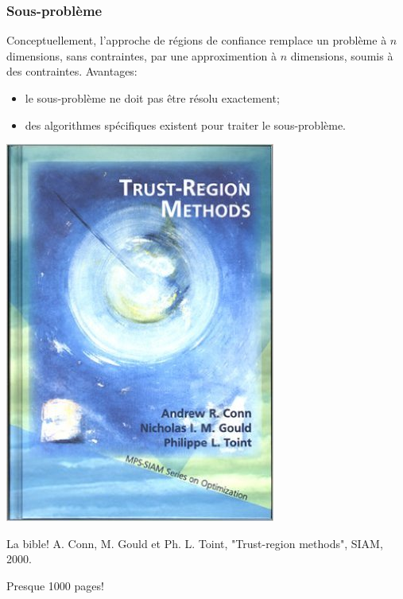 \documentclass[t,usepdftitle=false]{beamer}
\begin{document}
\begin{frame}
\frametitle{Sous-problème}

Conceptuellement, l'approche de régions de confiance remplace un problème à $n$ dimensions, sans contraintes, par une approximention à $n$ dimensions, soumis à des contraintes.
Avantages:
\begin{itemize}
\item
le sous-problème ne doit pas être résolu exactement;
\item
des algorithmes spécifiques existent pour traiter le sous-problème.
\end{itemize}

\begin{minipage}{0.3\textwidth}
	\includegraphics[width=\textwidth]{trbook.jpg}
\end{minipage}
\begin{minipage}{0.65\textwidth}
	La bible! A. Conn, M. Gould et Ph. L. Toint, "Trust-region methods", SIAM, 2000.
	
	\mbox{}
	
	Presque 1000 pages!
	
\end{minipage}

\end{frame}
\end{document}
